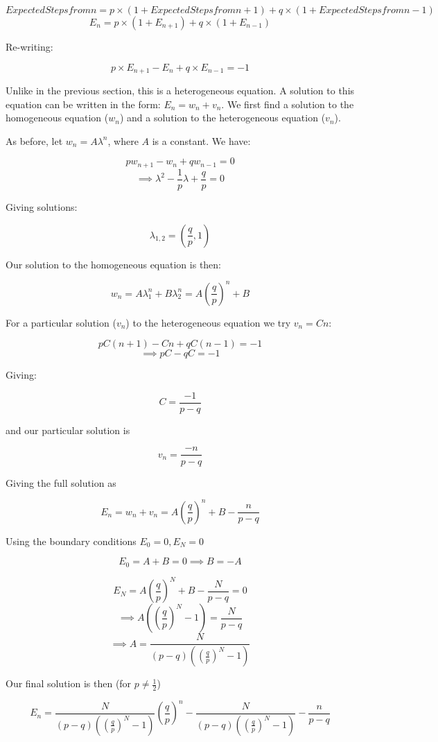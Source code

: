 \documentclass{article}
\begin{document}
$$Expected Steps from n = p \times (1 + Expected Steps from n+1) + q \times (1 + Expected Steps from n-1) $$
$$E_n = p \times (1 + E_{n+1}) + q \times (1 + E_{n-1}) $$

Re-writing:

$$p \times E_{n+1} - E_n + q \times E_{n-1} = -1$$

Unlike in the previous section, this is a heterogeneous equation. A solution to this equation can be written in the form: $E_n = w_n + v_n$. We first find a solution to the homogeneous equation ($w_n$) and a solution to the heterogeneous equation ($v_n$). 

As before, let $w_n = A \lambda^n$, where $A$ is a constant. We have:

$$p w_{n+1} - w_n + q w_{n-1} = 0$$
$$\implies \lambda^2 - \frac{1}{p} \lambda + \frac{q}{p} = 0$$

Giving solutions:

$$\lambda_{1,2} = (\frac{q}{p}, 1)$$

Our solution to the homogeneous equation is then:

$$w_n = A \lambda_1^n + B \lambda_2^n = A (\frac{q}{p})^n + B$$

For a particular solution ($v_n$) to the heterogeneous equation we try $v_n = Cn$:

$$p C(n+1) - Cn + q C(n-1) = -1 $$
$$\implies pC - qC = -1$$

Giving:

$$C = \frac{-1}{p-q}$$

and our particular solution is 

$$v_n = \frac{-n}{p-q}$$

Giving the full solution as

\begin{equation}
    E_n = w_n + v_n = A (\frac{q}{p})^n + B - \frac{n}{p-q} 
\end{equation}

Using the boundary conditions $E_0 = 0, E_N = 0$

$$E_0 = A + B = 0 \implies B = -A$$

$$E_N = A (\frac{q}{p})^N + B - \frac{N}{p-q} = 0$$
$$\implies A((\frac{q}{p})^N - 1) = \frac{N}{p-q}$$
$$\implies A = \frac{N}{(p-q)((\frac{q}{p})^N - 1)}$$

Our final solution is then (for $p \neq \frac{1}{2}$)

\begin{equation}
    E_n = \frac{N}{(p-q)((\frac{q}{p})^N - 1)} (\frac{q}{p})^n - \frac{N}{(p-q)((\frac{q}{p})^N - 1)} - \frac{n}{p-q} 
\end{equation}
\end{document}
